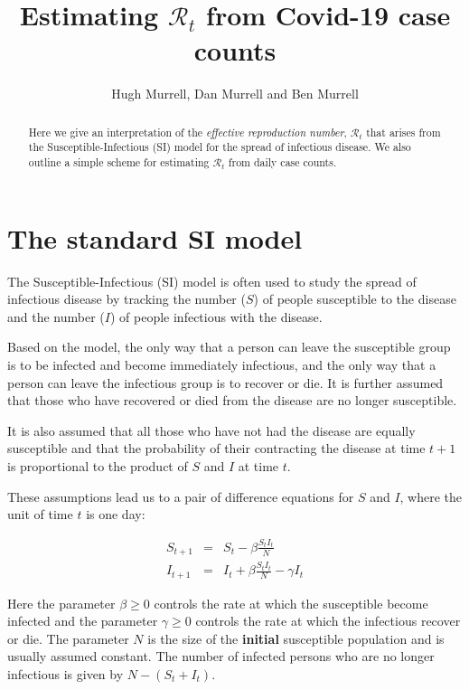 \documentclass[11pt]{article}
\begin{document}
\title{Estimating $\mathcal{R}_t$ from Covid-19 case counts}
\author{ Hugh Murrell, Dan Murrell and Ben Murrell}
\maketitle

\begin{abstract}
Here we give an interpretation of
the {\it effective reproduction number}, $\mathcal{R}_t$ that arises
from the Susceptible-Infectious (SI) model 
for the spread of infectious disease. We also outline a simple scheme for
estimating $\mathcal{R}_t$ from daily case counts.
\end{abstract}

\section{The standard SI model}
The Susceptible-Infectious (SI) model \cite{Wikipedia} is often used 
to study the spread of infectious disease by tracking the number ($S$) of people 
susceptible to the disease and the number ($I$) of people infectious with the disease.

Based on the model, the only way that a person can leave the susceptible
group is to be infected and become immediately infectious, and the only way 
that a person can leave the infectious group is to recover or die. 
It is further assumed that those who have recovered or died from the disease 
are no longer susceptible.

It is also assumed that all those who have not had the disease are 
equally susceptible and that the probability of their contracting the 
disease at time $t+1$ is proportional to the product of $S$ and $I$ at time $t$. 

These assumptions lead us to a pair of difference equations
for $S$ and $I$, where the unit of time $t$ is one day:

\begin{eqnarray}
S_{t+1} & = & S_t - \beta \frac{S_t I_t}{N} \label{eq1a} \\
I_{t+1} & = & I_t + \beta \frac{S_t I_t}{N} - \gamma I_t \label{eq1b} 
\end{eqnarray}

Here the parameter $\beta \geq 0$ controls the rate at which the susceptible
become infected and the parameter $\gamma \geq 0$ controls the rate
at which the infectious recover or die. The parameter $N$ is the size of
the {\bf initial} susceptible population and is usually assumed constant. 
The number of infected persons who are no longer infectious
is given by $N-(S_t+I_t)$.
\end{document}
